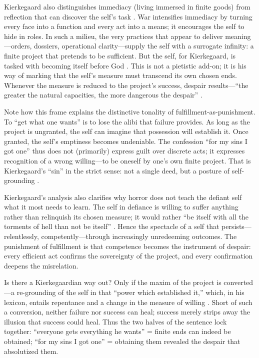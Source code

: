 Kierkegaard also distinguishes immediacy (living immersed in finite goods) from reflection that
can discover the self's task \parencite[pp.~84--90]{KierkegaardSUD1980}. War intensifies
immediacy by turning every face into a function and every act into a means; it encourages the
self to hide in roles. In such a milieu, the very practices that appear to deliver meaning—orders,
dossiers, operational clarity—supply the self with a surrogate infinity: a finite project that
pretends to be sufficient. But the self, for Kierkegaard, is tasked with becoming itself before
God \parencite[pp.~79--83]{KierkegaardSUD1980}. This is not a pietistic add-on; it is his way
of marking that the self's measure must transcend its own chosen ends. Whenever the measure is
reduced to the project's success, despair results—``the greater the natural capacities, the more
dangerous the despair'' \parencite[pp.~76--78]{KierkegaardSUD1980}.

Note how this frame explains the distinctive tonality of fulfillment-as-punishment. To ``get
what one wants'' is to lose the alibi that failure provides. As long as the project is ungranted,
the self can imagine that possession will establish it. Once granted, the self's emptiness
becomes undeniable. The confession ``for my sins I got one'' thus does not (primarily) express
guilt over discrete acts; it expresses recognition of a wrong willing—to be oneself by one's own
finite project. That is Kierkegaard's ``sin'' in the strict sense: not a single deed, but a
posture of self-grounding \parencite[pp.~79--83]{KierkegaardSUD1980}.

Kierkegaard's analysis also clarifies why horror does not teach the defiant self what it most
needs to learn. The self in defiance is willing to suffer anything rather than relinquish its
chosen measure; it would rather ``be itself with all the torments of hell than not be itself''
\parencite[p.~69]{KierkegaardSUD1980}. Hence the spectacle of a self that persists—relentlessly,
competently—through increasingly unredeeming outcomes. The punishment of fulfillment is that
competence becomes the instrument of despair: every efficient act confirms the sovereignty of
the project, and every confirmation deepens the misrelation.

Is there a Kierkegaardian way out? Only if the maxim of the project is converted—a re-grounding
of the self in that ``power which established it,'' which, in his lexicon, entails repentance
and a change in the measure of willing \parencite[pp.~79--83, 111--116]{KierkegaardSUD1980}.
Short of such a conversion, neither failure nor success can heal; success merely strips away
the illusion that success could heal. Thus the two halves of the sentence lock together:
``everyone gets everything he wants'' = finite ends can indeed be obtained; ``for my sins I got
one'' = obtaining them revealed the despair that absolutized them.
